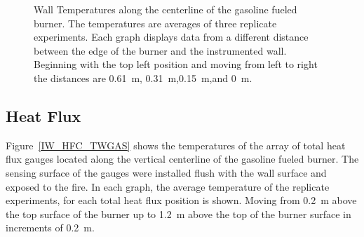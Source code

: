 \documentclass[twoside]{uocthesis}
\begin{document}
{{\begin{figure}[p]
	\caption[Wall Temperatures along the centerline of the gasoline fueled burner]{Wall Temperatures along the centerline of the gasoline fueled burner. The temperatures are averages of three replicate experiments. Each graph displays data from a different distance between the edge of the burner and the instrumented wall.  Beginning with the top left position and moving from left to right the distances are 0.61~m, 0.31~m,0.15~m,and 0~m.}
	\label{IW_SC_TWGAS}
\end{figure}



\subsection{Heat Flux}

Figure~\ref{IW_HFC_TWGAS} shows the temperatures of the array of total heat flux gauges located along the vertical centerline of the gasoline fueled burner.  The sensing surface of the gauges were installed flush with the wall surface and exposed to the fire. In each graph, the average temperature of the replicate experiments, for each total heat flux position is shown.  Moving from 0.2~m above the top surface of the burner up to 1.2~m above the top of the burner surface in increments of 0.2~m.

}}
\end{document}

